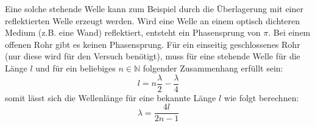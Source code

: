 Eine solche stehende Welle kann zum Beispiel durch die Überlagerung mit einer reflektierten Welle erzeugt werden. Wird eine Welle an einem optisch dichteren Medium (z.B. eine Wand) reflektiert, entsteht ein Phasensprung von $\pi$. Bei einem offenen Rohr gibt es keinen Phasensprung. Für ein einseitig geschlossenes Rohr (nur diese wird für den Versuch benötigt), muss für eine stehende Welle für die Länge $l$ und für ein beliebiges $n \in \mathbb{N}$ folgender Zusammenhang erfüllt sein:
\begin{equation*}
l = n \frac{\lambda}{2}-\frac{\lambda}{4}
\end{equation*}
somit lässt sich die Wellenlänge für eine bekannte Länge $l$ wie folgt berechnen:
\begin{equation}
\lambda = \frac{4l}{2n-1}
\label{eq:wavelength}
\end{equation}





